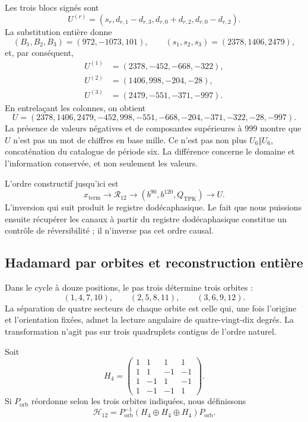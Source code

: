 Les trois blocs signés sont
\begin{equation}
 U^{(r)}=(s_r,d_{r,1}-d_{r,3},d_{r,0}+d_{r,2},d_{r,0}-d_{r,2}).
 \label{x_reciprocidad:eq:k-bloques-firmados}
\end{equation}
La substitution entière donne
\[
 (B_1,B_2,B_3)=(972,-1073,101),\qquad
 (s_1,s_2,s_3)=(2378,1406,2479),
\]
et, par conséquent,
\begin{align*}
 U^{(1)}&=(2378,-452,-668,-322),\\
 U^{(2)}&=(1406,998,-204,-28),\\
 U^{(3)}&=(2479,-551,-371,-997).
\end{align*}
En entrelaçant les colonnes, on obtient
\begin{equation}
 U=(2378,1406,2479,-452,998,-551,
       -668,-204,-371,-322,-28,-997).
 \label{x_reciprocidad:eq:k-u-firmado}
\end{equation}
La présence de valeurs négatives et de composantes supérieures à 999
montre que \(U\) n'est pas un mot de chiffres en base mille. Ce n'est pas non plus
\(U_6\Vert U_6\), concaténation du catalogue de période six. La différence
concerne le domaine et l'information conservée, et non seulement les valeurs.

L'ordre constructif jusqu'ici est
\[
 x_{\mathrm{term}}\longrightarrow\mathcal R_{12}
 \longrightarrow(b^{90},b^{120},Q_{\mathrm{TPK}})
 \longrightarrow U.
\]
L'inversion qui suit produit le registre dodécaphasique. Le fait que nous puissions ensuite récupérer les canaux à partir du registre dodécaphasique constitue un contrôle de réversibilité ; il n'inverse pas cet ordre causal.

\subsection{Hadamard par orbites et reconstruction entière}
\label{x_reciprocidad:subsec:k-hadamard}

Dans le cycle à douze positions, le pas trois détermine trois orbites :
\[
 (1,4,7,10),\qquad(2,5,8,11),\qquad(3,6,9,12).
\]
La séparation de quatre secteurs de chaque orbite est celle qui, une fois
l'origine et l'orientation fixées, admet la lecture angulaire de quatre-vingt-dix degrés. La
transformation n'agit pas sur trois quadruplets contigus de l'ordre naturel.

Soit
\[
 H_4=\begin{pmatrix}
 1&1&1&1\\1&1&-1&-1\\1&-1&1&-1\\1&-1&-1&1
 \end{pmatrix}.
\]
Si \(P_{\mathrm{orb}}\) réordonne selon les trois orbites indiquées, nous définissons
\[
 \mathcal H_{12}=P_{\mathrm{orb}}^{-1}
 (H_4\oplus H_4\oplus H_4)P_{\mathrm{orb}}.
\]

